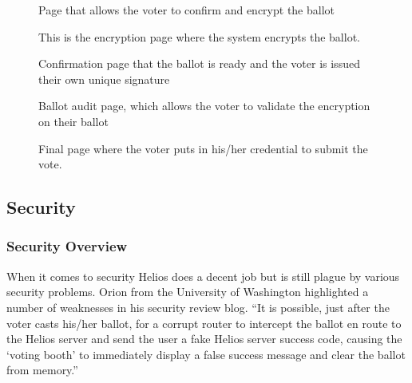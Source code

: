 \begin{figure}
  \centering {}
  \caption{Page that allows the voter to confirm and encrypt the
    ballot}
  \label{fig:helios-confirm}
\end{figure}

\begin{figure}
  \centering {}
  \caption{This is the encryption page where the system encrypts the
    ballot.}
  \label{fig:helios-encrypt}
\end{figure}

\begin{figure}
  \centering {}
  \caption{Confirmation page that the ballot is ready and the voter is
    issued their own unique signature}
  \label{fig:helios-signature}
\end{figure}

\begin{figure}
  \centering {}
  \caption{Ballot audit page, which allows the voter to validate the
    encryption on their ballot}
  \label{fig:helios-audit}
\end{figure}

\begin{figure}
  \centering {}
  \caption{Final page where the voter puts in his/her credential to
    submit the vote.}
  \label{fig:helios-submit}
\end{figure}

\subsection{Security}

\subsubsection{Security Overview}

When it comes to security Helios does a decent job but is still plague
by various security problems. Orion from the University of Washington
highlighted a number of weaknesses in his security review blog. ``It
is possible, just after the voter casts his/her ballot, for a corrupt
router to intercept the ballot en route to the Helios server and send
the user a fake Helios server success code, causing the `voting booth'
to immediately display a false success message and clear the ballot
from memory.''~\cite{orion2009}


